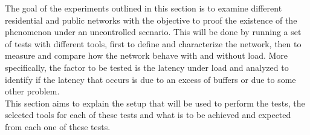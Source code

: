 The goal of the experiments outlined in this section is to examine different 
residential and public networks with the objective to proof the existence of the 
phenomenon under an uncontrolled scenario. This will be done by running a set of 
tests with different tools, first to define and characterize the network, then to 
measure and compare how the network behave with and without load. More specifically, 
the factor to be tested is the latency under load and analyzed to identify if the 
latency that occurs is due to an excess of buffers or due to some other problem.\\

This section aims to explain the setup that will be used to perform the tests,
the selected tools for each of these tests and what is to be achieved and 
expected from each one of these tests.\\
